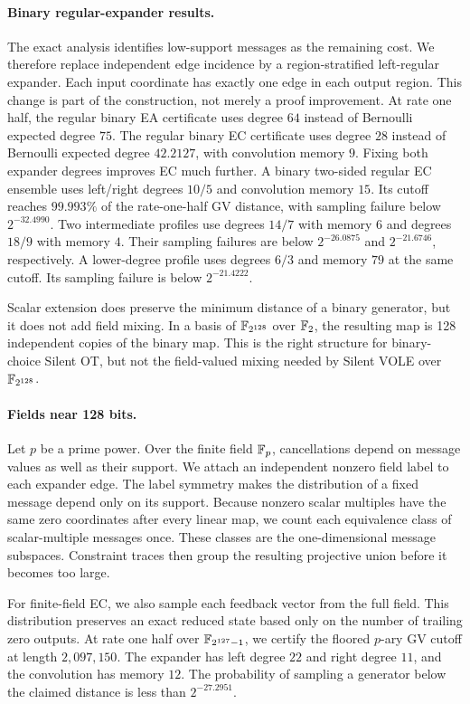 \paragraph{Binary regular-expander results.}
The exact analysis identifies low-support messages as the remaining cost.
We therefore replace independent edge incidence by a region-stratified
left-regular expander.  Each input coordinate has exactly one edge in each
output region.  This change is part of the construction, not merely a proof
improvement.  At rate one half, the regular binary EA certificate uses degree
$64$ instead of Bernoulli expected degree $75$.  The regular binary EC
certificate uses degree $28$ instead of Bernoulli expected degree $42.2127$,
with convolution memory $9$.  Fixing both expander degrees improves EC much
further.  A binary two-sided regular EC ensemble uses left/right degrees
$10/5$ and convolution memory $15$.  Its cutoff reaches $99.993\%$ of the
rate-one-half GV distance, with sampling failure below $2^{-32.4990}$.
Two intermediate profiles use degrees $14/7$ with memory $6$ and degrees
$18/9$ with memory $4$.  Their sampling failures are below $2^{-26.0875}$
and $2^{-21.6746}$, respectively.
A lower-degree profile uses degrees $6/3$ and memory $79$ at the same cutoff.
Its sampling failure is below $2^{-21.4222}$.

Scalar extension does preserve the minimum distance of a binary generator,
but it does not add field mixing.  In a basis of $\mathbb F_{2^{128}}$ over $\mathbb F_2$,
the resulting map is 128 independent copies of the binary map.  This is the
right structure for binary-choice Silent OT, but not the field-valued mixing
needed by Silent VOLE over $\mathbb F_{2^{128}}$.

\paragraph{Fields near 128 bits.}
Let $p$ be a prime power.  Over the finite field $\mathbb F_p$, cancellations depend
on message values as well as their support.
We attach an independent nonzero field label to each expander edge.  The label
symmetry makes the distribution of a fixed message depend only on its support.
Because nonzero scalar multiples have the same zero coordinates after every
linear map, we count each equivalence class of scalar-multiple messages once.
These classes are the one-dimensional message subspaces.
Constraint traces then group the resulting projective union before it becomes
too large.

For finite-field EC, we also sample each feedback vector from the full field.
This distribution preserves an exact reduced state based only on the number
of trailing zero outputs.  At rate one half over $\mathbb F_{2^{127}-1}$, we certify
the floored $p$-ary GV cutoff at length $2{,}097{,}150$.  The expander has
left degree $22$ and right degree $11$, and the convolution has memory $12$.
The probability of sampling a generator below the claimed distance is less
than $2^{-27.2951}$.

